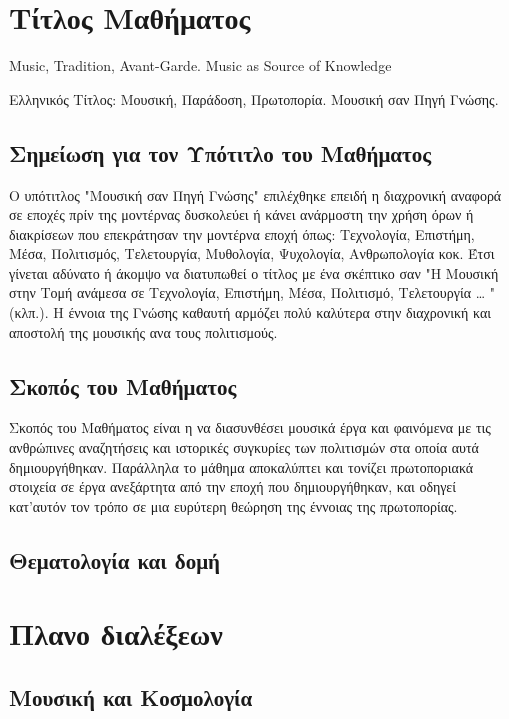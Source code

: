 \section{Τίτλος Μαθήματος}
\label{sec:org5dbd0d0}

Music, Tradition, Avant-Garde. Music as Source of Knowledge

Ελληνικός Τίτλος: Μουσική, Παράδοση, Πρωτοπορία.  Μουσική σαν Πηγή Γνώσης.
\subsection{Σημείωση για τον Υπότιτλο του Μαθήματος}
\label{sec:org42e7b88}

Ο υπότιτλος "Μουσική σαν Πηγή Γνώσης" επιλέχθηκε επειδή η διαχρονική αναφορά σε εποχές πρίν της μοντέρνας δυσκολεύει ή κάνει ανάρμοστη την χρήση όρων ή διακρίσεων που επεκράτησαν την μοντέρνα εποχή όπως: Τεχνολογία, Επιστήμη, Μέσα, Πολιτισμός, Τελετουργία, Μυθολογία, Ψυχολογία, Ανθρωπολογία κοκ.  Έτσι γίνεται αδύνατο ή άκομψο να διατυπωθεί ο τίτλος με ένα σκέπτικο σαν "Η Μουσική στην Τομή ανάμεσα σε Τεχνολογία, Επιστήμη, Μέσα, Πολιτισμό, Τελετουργία \ldots{} " (κλπ.).  Η έννοια της Γνώσης καθαυτή αρμόζει πολύ καλύτερα στην διαχρονική και αποστολή της μουσικής ανα τους πολιτισμούς.
\subsection{Σκοπός του Μαθήματος}
\label{sec:org1f16afd}

Σκοπός του Μαθήματος είναι η να διασυνθέσει μουσικά έργα και φαινόμενα με τις ανθρώπινες αναζητήσεις και ιστορικές συγκυρίες των πολιτισμών στα οποία αυτά δημιουργήθηκαν. Παράλληλα το μάθημα αποκαλύπτει και τονίζει πρωτοποριακά στοιχεία σε έργα ανεξάρτητα από την εποχή που δημιουργήθηκαν, και οδηγεί κατ'αυτόν τον τρόπο σε μια ευρύτερη θεώρηση της έννοιας της πρωτοπορίας. 

\subsection{Θεματολογία και δομή}
\label{sec:org30f4830}

\section{Πλανο διαλέξεων}
\label{sec:orgeac4540}
\subsection{Μουσική και Κοσμολογία}
\label{sec:org90d22e4}
